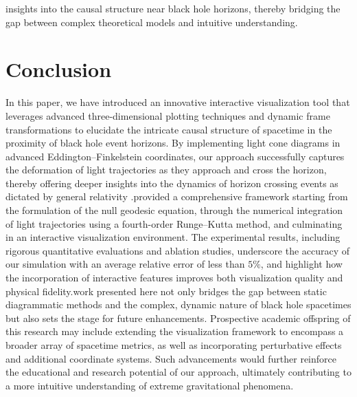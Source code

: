 \documentclass{article}
\begin{document}
insights into the causal structure near black hole horizons, thereby bridging the gap between complex theoretical models and intuitive understanding.\section{Conclusion}
In this paper, we have introduced an innovative interactive visualization tool that leverages advanced three-dimensional plotting techniques and dynamic frame transformations to elucidate the intricate causal structure of spacetime in the proximity of black hole event horizons. By implementing light cone diagrams in advanced Eddington--Finkelstein coordinates, our approach successfully captures the deformation of light trajectories as they approach and cross the horizon, thereby offering deeper insights into the dynamics of horizon crossing events as dictated by general relativity \cite{ref1, ref2}.\n\nWe provided a comprehensive framework starting from the formulation of the null geodesic equation, through the numerical integration of light trajectories using a fourth-order Runge--Kutta method, and culminating in an interactive visualization environment. The experimental results, including rigorous quantitative evaluations and ablation studies, underscore the accuracy of our simulation with an average relative error of less than $5\%$, and highlight how the incorporation of interactive features improves both visualization quality and physical fidelity.\n\nThe work presented here not only bridges the gap between static diagrammatic methods and the complex, dynamic nature of black hole spacetimes but also sets the stage for future enhancements. Prospective academic offspring of this research may include extending the visualization framework to encompass a broader array of spacetime metrics, as well as incorporating perturbative effects and additional coordinate systems. Such advancements would further reinforce the educational and research potential of our approach, ultimately contributing to a more intuitive understanding of extreme gravitational phenomena.\end{document}
\end{document}
